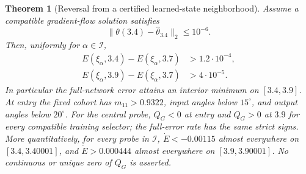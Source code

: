 \documentclass[10pt]{article}
\newtheorem{theorem}{Theorem}[section]
\begin{document}
\begin{theorem}[Reversal from a certified learned-state neighborhood]
\label{thm:local-certificate}
Assume a compatible gradient-flow solution satisfies
\begin{equation}\label{eq:entry-missing}
 \|\theta(3.4)-\widehat\theta_{3.4}\|_2\le10^{-6}.
\end{equation}
Then, uniformly for $\alpha\in\mathcal I$,
\begin{align*}
 E(\xi_\alpha,3.4)-E(\xi_\alpha,3.7)&>1.2\cdot10^{-4},\\
 E(\xi_\alpha,3.9)-E(\xi_\alpha,3.7)&>4\cdot10^{-5}.
\end{align*}
In particular the full-network error attains an interior minimum on
$[3.4,3.9]$. At entry the fixed cohort has $m_{11}>0.9322$, input angles
below $15^\circ$, and output angles below $20^\circ$.
For the central probe, $Q_G<0$ at entry and $Q_G>0$ at $3.9$ for every
compatible training selector; the full-error rate has the same strict signs.
More quantitatively, for every probe in $\mathcal I$,
$\dot E<-0.00115$ almost everywhere on $[3.4,3.40001]$, and
$\dot E>0.000444$ almost everywhere on $[3.9,3.90001]$.
No continuous or unique zero of $Q_G$ is asserted.
\end{theorem}
\end{document}
